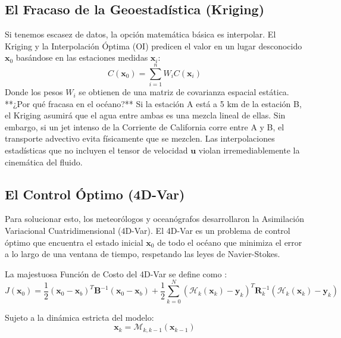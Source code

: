 \documentclass[11pt,a4paper]{article}
\begin{document}
\subsection{El Fracaso de la Geoestadística (Kriging)}
Si tenemos escasez de datos, la opción matemática básica es interpolar. El Kriging y la Interpolación Óptima (OI) predicen el valor en un lugar desconocido $\mathbf{x}_0$ basándose en las estaciones medidas $\mathbf{x}_i$:
\begin{equation}
\hat{C}(\mathbf{x}_0) = \sum_{i=1}^n W_i C(\mathbf{x}_i)
\end{equation}
Donde los pesos $W_i$ se obtienen de una matriz de covarianza espacial estática.
**¿Por qué fracasa en el océano?** Si la estación A está a 5 km de la estación B, el Kriging asumirá que el agua entre ambas es una mezcla lineal de ellas. Sin embargo, si un jet intenso de la Corriente de California corre entre A y B, el transporte advectivo evita físicamente que se mezclen. Las interpolaciones estadísticas que no incluyen el tensor de velocidad $\mathbf{u}$ violan irremediablemente la cinemática del fluido.

\subsection{El Control Óptimo (4D-Var)}
Para solucionar esto, los meteorólogos y oceanógrafos desarrollaron la Asimilación Variacional Cuatridimensional (4D-Var). El 4D-Var es un problema de control óptimo que encuentra el estado inicial $\mathbf{x}_0$ de todo el océano que minimiza el error a lo largo de una ventana de tiempo, respetando las leyes de Navier-Stokes.

La majestuosa Función de Costo del 4D-Var se define como \cite{evensen1994}:
\begin{equation}
J(\mathbf{x}_0) = \frac{1}{2} (\mathbf{x}_0 - \mathbf{x}_b)^T \mathbf{B}^{-1} (\mathbf{x}_0 - \mathbf{x}_b) + \frac{1}{2} \sum_{k=0}^N (\mathcal{H}_k(\mathbf{x}_k) - \mathbf{y}_k)^T \mathbf{R}_k^{-1} (\mathcal{H}_k(\mathbf{x}_k) - \mathbf{y}_k)
\end{equation}

Sujeto a la dinámica estricta del modelo:
\begin{equation}
\mathbf{x}_k = \mathcal{M}_{k, k-1} (\mathbf{x}_{k-1})
\end{equation}
\end{document}
